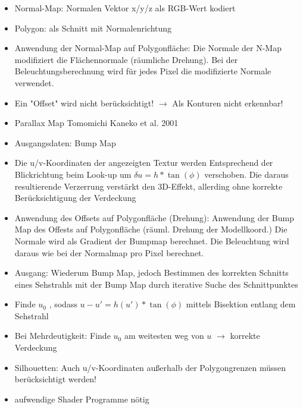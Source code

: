 \documentclass[10pt,landscape]{article}
\begin{document}
\begin{multicols}{3}
{\begin{itemize}
  
  \item Normal-Map: Normalen Vektor x/y/z als RGB-Wert kodiert
  \item Polygon: als Schnitt mit Normalenrichtung
  \item Anwendung der Normal-Map auf Polygonfläche: Die Normale der N-Map modifiziert die Flächennormale (räumliche Drehung). Bei der Beleuchtungsberechnung wird für jedes Pixel die modifizierte Normale verwendet.
  \item Ein "Offset" wird nicht berücksichtigt! $\rightarrow$ Als Konturen nicht erkennbar!
  
  \item Parallax Map Tomomichi Kaneko et al. 2001
  \item Ausgangsdaten: Bump Map
  \item Die u/v-Koordinaten der angezeigten Textur werden Entsprechend der Blickrichtung beim Look-up um $\delta u = h * \tan(\phi)$ verschoben. Die daraus resultierende Verzerrung verstärkt den 3D-Effekt, allerding ohne korrekte Berücksichtigung der Verdeckung
  \item Anwendung des Offsets auf Polygonfläche (Drehung): Anwendung der Bump Map des Offests auf Polygonfläche (räuml. Drehung der Modellkoord.) Die Normale wird als Gradient der Bumpmap berechnet. Die Beleuchtung wird daraus wie bei der Normalmap pro Pixel berechnet.
  
  \item Ausgang: Wiederum Bump Map, jedoch Bestimmen des korrekten Schnitts eines Sehstrahls mit der Bump Map durch iterative Suche des Schnittpunktes
  \item Finde $u_0$ , sodass $u-u' = h(u') * \tan(\phi)$ mittels Bisektion entlang dem Sehstrahl
  \item Bei Mehrdeutigkeit: Finde $u_0$ am weitesten weg von $u$ $\rightarrow$ korrekte Verdeckung
  \item Silhouetten: Auch u/v-Koordinaten außerhalb der Polygongrenzen müssen berücksichtigt werden!
  \item aufwendige Shader Programme nötig
  

\end{itemize}}
\end{multicols}
\end{document}
